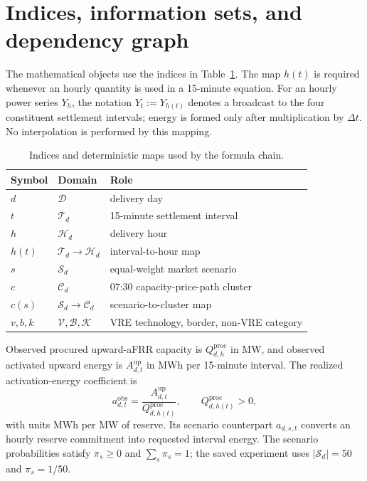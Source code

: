 \documentclass[11pt,a4paper]{article}
\begin{document}
\section{Indices, information sets, and dependency graph}

The mathematical objects use the indices in Table~\ref{tab:indices}.  The map
$h(t)$ is required whenever an hourly quantity is used in a 15-minute equation.
For an hourly power series $Y_h$, the notation $Y_t:=Y_{h(t)}$ denotes a
broadcast to the four constituent settlement intervals; energy is formed only
after multiplication by $\Delta t$.  No interpolation is performed by this
mapping.

\begin{table}[htbp]
  \centering
  \caption{Indices and deterministic maps used by the formula chain.}
  \begin{tabular}{lll}
    \toprule
    Symbol & Domain & Role \\
    \midrule
    $d$ & $\mathcal{D}$ & delivery day \\
    $t$ & $\mathcal{T}_d$ & 15-minute settlement interval \\
    $h$ & $\mathcal{H}_d$ & delivery hour \\
    $h(t)$ & $\mathcal{T}_d\rightarrow\mathcal{H}_d$ & interval-to-hour map \\
    $s$ & $\mathcal{S}_d$ & equal-weight market scenario \\
    $c$ & $\mathcal{C}_d$ & 07:30 capacity-price-path cluster \\
    $c(s)$ & $\mathcal{S}_d\rightarrow\mathcal{C}_d$ & scenario-to-cluster map \\
    $v,b,k$ & $\mathcal{V},\mathcal{B},\mathcal{K}$ & VRE technology, border, non-VRE category \\
    \bottomrule
  \end{tabular}
  \label{tab:indices}
\end{table}

Observed procured upward-aFRR capacity is $Q^{\mathrm{proc}}_{d,h}$ in MW, and
observed activated upward energy is $A^{\mathrm{up}}_{d,t}$ in MWh per
15-minute interval.  The realized activation-energy coefficient is
\begin{equation}
  a^{\mathrm{obs}}_{d,t}
  =\frac{A^{\mathrm{up}}_{d,t}}
  {Q^{\mathrm{proc}}_{d,h(t)}},
  \qquad Q^{\mathrm{proc}}_{d,h(t)}>0,
  \label{eq:activation-coefficient}
\end{equation}
with units MWh per MW of reserve.  Its scenario counterpart $a_{d,s,t}$
converts an hourly reserve commitment into requested interval energy.  The
scenario probabilities satisfy $\pi_s\geq0$ and $\sum_s\pi_s=1$; the saved
experiment uses $|\mathcal{S}_d|=50$ and $\pi_s=1/50$.
\end{document}

